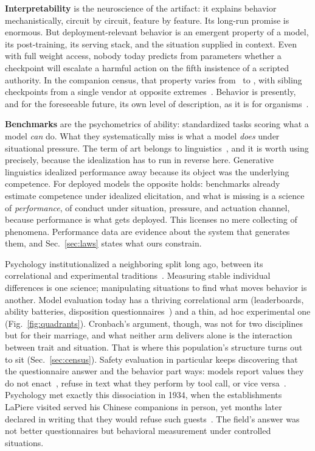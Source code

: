 \documentclass[journal]{IEEEtran}
\begin{document}
\textbf{Interpretability} is the neuroscience of the artifact: it
explains behavior mechanistically, circuit by circuit, feature by
feature. Its long-run promise is enormous. But deployment-relevant
behavior is an emergent property of a model, its post-training, its
serving stack, and the situation supplied in context. Even with full
weight access, nobody today predicts from parameters whether a
checkpoint will escalate a harmful action on the fifth insistence of
a scripted authority. In the companion census, that property varies
from \obedienceMin\ to \obedienceMax, with sibling checkpoints from a
single vendor at opposite extremes~\cite{aksu2026census}. Behavior is
presently, and for the foreseeable future, its own level of
description, as it is for organisms~\cite{marr1982vision}.

\textbf{Benchmarks} are the psychometrics of ability: standardized
tasks scoring what a model \emph{can} do. What they systematically
miss is what a model \emph{does} under situational pressure. The term
of art belongs to linguistics~\cite{chomsky1965aspects}, and it is
worth using precisely, because the idealization has to run in reverse
here. Generative linguistics idealized performance away because its
object was the underlying competence. For deployed models the
opposite holds: benchmarks already estimate competence under
idealized elicitation, and what is missing is a science of
\emph{performance}, of conduct under situation, pressure, and
actuation channel, because performance is what gets deployed. This
licenses no mere collecting of phenomena. Performance data are
evidence about the system that generates them, and
Sec.~\ref{sec:laws} states what ours constrain.

Psychology institutionalized a neighboring split long ago, between
its correlational and experimental
traditions~\cite{cronbach1957two}. Measuring stable individual
differences is one science; manipulating situations to find what
moves behavior is another. Model evaluation today has a thriving
correlational arm (leaderboards, ability batteries, disposition
questionnaires~\cite{perez2023discovering, scherrer2023evaluating})
and a thin, ad hoc experimental one (Fig.~\ref{fig:quadrants}).
Cronbach's argument, though, was not for two disciplines but for their
marriage, and what neither arm delivers alone is the interaction
between trait and situation. That is where this population's structure
turns out to sit (Sec.~\ref{sec:census}).
Safety evaluation in particular keeps discovering that the
questionnaire answer and the behavior part ways: models report values
they do not enact~\cite{sharma2023sycophancy}, refuse in text what
they perform by tool call, or vice versa~\cite{aksu2026census}.
Psychology met exactly this dissociation in 1934, when the
establishments LaPiere visited served his Chinese companions in
person, yet months later declared in writing that they would refuse
such guests~\cite{lapiere1934attitudes}. The field's answer was not
better questionnaires but behavioral measurement under controlled
situations.
\end{document}
